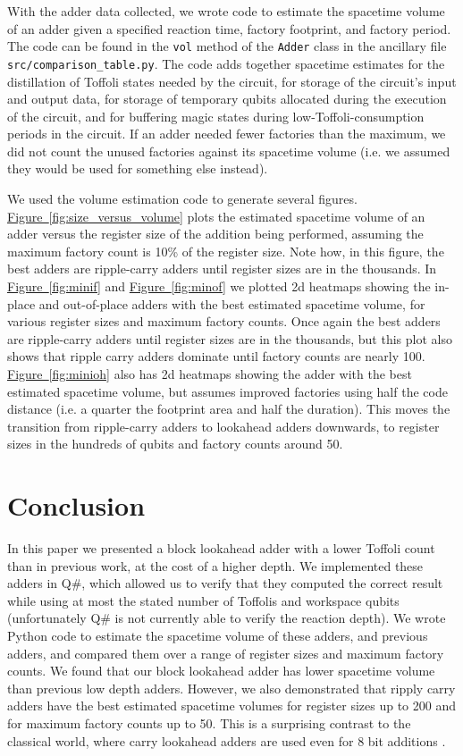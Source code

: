 \documentclass[onecolumn,unpublished]{quantumarticle}
\theoremstyle{definition}
\theoremstyle{definition}
\theoremstyle{definition}
\newcommand{\fig}[1]{\hyperref[fig:#1]{Figure~\ref*{fig:#1}}}
\begin{document}
With the adder data collected, we wrote code to estimate the spacetime volume of an adder given a specified reaction time, factory footprint, and factory period.
The code can be found in the \texttt{vol} method of the \texttt{Adder} class in the ancillary file \texttt{src/comparison\_table.py}.
The code adds together spacetime estimates for the distillation of Toffoli states needed by the circuit, for storage of the circuit's input and output data, for storage of temporary qubits allocated during the execution of the circuit, and for buffering magic states during low-Toffoli-consumption periods in the circuit.
If an adder needed fewer factories than the maximum, we did not count the unused factories against its spacetime volume (i.e. we assumed they would be used for something else instead).

We used the volume estimation code to generate several figures.
\fig{size_versus_volume} plots the estimated spacetime volume of an adder versus the register size of the addition being performed, assuming the maximum factory count is 10\% of the register size.
Note how, in this figure, the best adders are ripple-carry adders until register sizes are in the thousands.
In \fig{minif} and \fig{minof} we plotted 2d heatmaps showing the in-place and out-of-place adders with the best estimated spacetime volume, for various register sizes and maximum factory counts.
Once again the best adders are ripple-carry adders until register sizes are in the thousands, but this plot also shows that ripple carry adders dominate until factory counts are nearly 100.
\fig{minioh} also has 2d heatmaps showing the adder with the best estimated spacetime volume, but assumes improved factories using half the code distance (i.e. a quarter the footprint area and half the duration).
This moves the transition from ripple-carry adders to lookahead adders downwards, to register sizes in the hundreds of qubits and factory counts around 50.

\section{Conclusion}
\label{sec:conclusion}

In this paper we presented a block lookahead adder with a lower Toffoli count than in previous work, at the cost of a higher depth.
We implemented these adders in Q\#, which allowed us to verify that they computed the correct result while using at most the stated number of Toffolis and workspace qubits (unfortunately Q\# is not currently able to verify the reaction depth).
We wrote Python code to estimate the spacetime volume of these adders, and previous adders, and compared them over a range of register sizes and maximum factory counts.
We found that our block lookahead adder has lower spacetime volume than previous low depth adders.
However, we also demonstrated that ripply carry adders have the best estimated spacetime volumes for register sizes up to 200 and for maximum factory counts up to 50.
This is a surprising contrast to the classical world, where carry lookahead adders are used even for 8 bit additions \cite{shirriff2020reverseengineer8008}.
\end{document}

